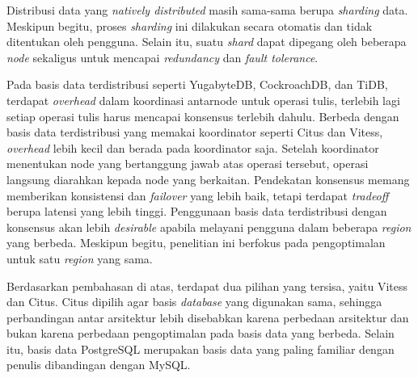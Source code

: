 Distribusi data yang \textit{natively distributed} masih sama-sama berupa \textit{sharding} data. Meskipun begitu, proses \textit{sharding} ini dilakukan secara otomatis dan tidak ditentukan oleh pengguna. Selain itu, suatu \textit{shard} dapat dipegang oleh beberapa \textit{node} sekaligus untuk mencapai \textit{redundancy} dan \textit{fault tolerance}.

Pada basis data terdistribusi seperti YugabyteDB, CockroachDB, dan TiDB, terdapat \textit{overhead} dalam koordinasi antarnode untuk operasi tulis, terlebih lagi setiap operasi tulis harus mencapai konsensus terlebih dahulu. Berbeda dengan basis data terdistribusi yang memakai koordinator seperti Citus dan Vitess, \textit{overhead} lebih kecil dan berada pada koordinator saja. Setelah koordinator menentukan node yang bertanggung jawab atas operasi tersebut, operasi langsung diarahkan kepada node yang berkaitan. Pendekatan konsensus memang memberikan konsistensi dan \textit{failover} yang lebih baik, tetapi terdapat \textit{tradeoff} berupa latensi yang lebih tinggi. Penggunaan basis data terdistribusi dengan konsensus akan lebih \textit{desirable} apabila melayani pengguna dalam beberapa \textit{region} yang berbeda. Meskipun begitu, penelitian ini berfokus pada pengoptimalan untuk satu \textit{region} yang sama.

Berdasarkan pembahasan di atas, terdapat dua pilihan yang tersisa, yaitu Vitess dan Citus. Citus dipilih agar basis \textit{database} yang digunakan sama, sehingga perbandingan antar arsitektur lebih disebabkan karena perbedaan arsitektur dan bukan karena perbedaan pengoptimalan pada basis data yang berbeda. Selain itu, basis data PostgreSQL merupakan basis data yang paling familiar dengan penulis dibandingan dengan MySQL.
